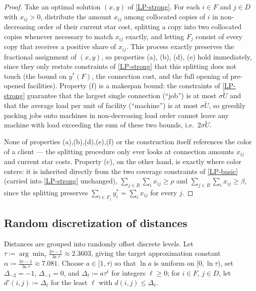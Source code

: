 \documentclass[a4paper,11pt]{article}
\begin{document}
\begin{proof}
Take an optimal solution $(x,y)$ of \eqref{LP-strong}. For each $i\in F$
and $j\in D$ with $x_{ij}>0$, distribute the amount $x_{ij}$ among
collocated copies of $i$ in non-decreasing order of their current star
cost, splitting a copy into two collocated copies whenever necessary to
match $x_{ij}$ exactly, and letting $F_j$ consist of every copy that
receives a positive share of $x_{ij}$. This process exactly preserves the
fractional assignment of $(x,y)$, so properties (a), (b), (d), (e) hold
immediately, since they only restate constraints of \eqref{LP-strong}
that this splitting does not touch (the bound on $y^*(F)$, the connection
cost, and the full opening of pre-opened facilities). Property (f) is a
makespan bound: the constraints of \eqref{LP-strong} guarantee that the
largest single connection (``job'') is at most $\sigma\tilde U$ and that
the average load per unit of facility (``machine'') is at most
$\sigma\tilde U$, so greedily packing jobs onto machines in
non-decreasing load order cannot leave any machine with load exceeding
the sum of these two bounds, i.e.\ $2\sigma\tilde U$.

None of properties (a),(b),(d),(e),(f) or the construction itself
references the color of a client — the splitting procedure only ever
looks at connection amounts $x_{ij}$ and current star costs. Property
(c), on the other hand, is exactly where color enters: it is inherited
directly from the two coverage constraints of \eqref{LP-basic} (carried
into \eqref{LP-strong} unchanged), $\sum_{j\in R}\sum_i x_{ij}\ge\rho$
and $\sum_{j\in B}\sum_i x_{ij}\ge\beta$, since the splitting preserves
$\sum_{i\in F_j} y^*_i = \sum_i x_{ij}$ for every $j$.
\end{proof}

\subsection{Random discretization of distances}

Distances are grouped into randomly offset discrete levels. Let
$\tau\coloneqq\arg\min_\tau \frac{3\tau-1}{\ln\tau}\approx 2.3603$, giving
the target approximation constant $\alpha\coloneqq\frac{3\tau-1}{\ln\tau}
\approx7.081$. Choose $a\in[1,\tau)$ so that $\ln a$ is uniform on
$[0,\ln\tau)$, set $\Delta_{-2}=-1$, $\Delta_{-1}=0$, and
$\Delta_\ell\coloneqq a\tau^\ell$ for integers $\ell\ge0$; for $i\in F$,
$j\in D$, let $d'(i,j)\coloneqq\Delta_\ell$ for the least $\ell$ with
$d(i,j)\le\Delta_\ell$.
\end{document}
